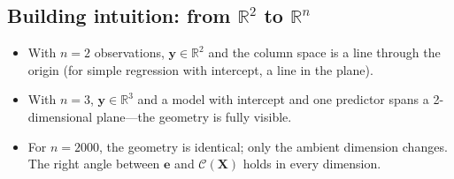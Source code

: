 \documentclass[11pt,a4paper]{article}
\theoremstyle{plain}
\theoremstyle{definition}
\newcommand{\R}{\mathbb{R}}
\newcommand{\bX}{\bm{X}}
\newcommand{\by}{\bm{y}}
\newcommand{\be}{\bm{e}}
\newcommand{\Col}{\mathcal{C}}
\begin{document}
\subsection{Building intuition: from $\R^2$ to $\R^n$}

\begin{itemize}[nosep]
\item With $n=2$ observations, $\by\in\R^2$ and the column space is a line
      through the origin (for simple regression with intercept, a line in the plane).
\item With $n=3$, $\by\in\R^3$ and a model with intercept and one predictor
      spans a 2-dimensional plane---the geometry is fully visible.
\item For $n=2000$, the geometry is identical; only the ambient dimension changes.
      The right angle between $\be$ and $\Col(\bX)$ holds in every dimension.
\end{itemize}
\end{document}
